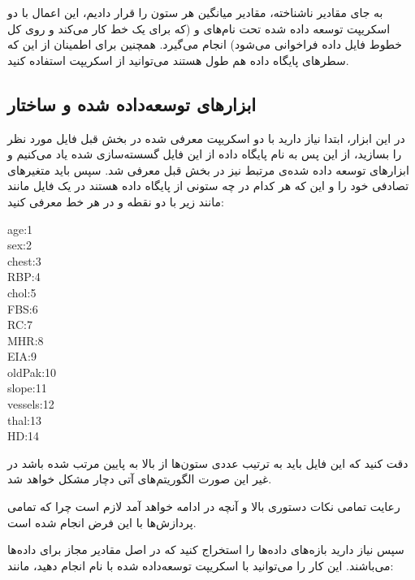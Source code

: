 \documentclass[11.5pt,a4paper]{article}
\begin{document}
به جای مقادیر ناشناخته، مقادیر میانگین هر ستون را قرار دادیم، این اعمال با دو اسکریپت توسعه داده شده تحت نام‌های  و  (که برای یک خط کار می‌کند و روی کل خطوط فایل داده فراخوانی می‌شود) انجام می‌گیرد. همچنین برای اطمینان از این که سطرهای پایگاه داده هم طول هستند می‌توانید از اسکریپت  استفاده کنید.


\subsection{ابزارهای توسعه‌داده شده و ساختار}

در این ابزار، ابتدا نیاز دارید با دو اسکریپت معرفی شده در بخش قبل فایل مورد نظر را بسازید، از این پس به نام پایگاه داده از این فایل گسسته‌سازی شده یاد می‌کنیم و ابزارهای توسعه‌ داده‌ شده‌ی مرتبط نیز در بخش قبل معرفی شد. سپس باید متغیرهای تصادفی خود را و این که هر کدام در چه ستونی از پایگاه داده هستند در یک فایل مانند  مانند زیر با دو نقطه و در هر خط معرفی کنید:

\begin{latin}
\noindent
age:1\\
sex:2\\
chest:3\\
RBP:4\\
chol:5\\
FBS:6\\
RC:7\\
MHR:8\\
EIA:9\\
oldPak:10\\
slope:11\\
vessels:12\\
thal:13\\
HD:14\\
\end{latin}

دقت کنید که این فایل باید به ترتیب عددی ستون‌ها از بالا به پایین مرتب شده باشد در غیر این صورت الگوریتم‌های آتی دچار مشکل خواهد شد. 


رعایت تمامی نکات دستوری بالا و آنچه در ادامه خواهد آمد لازم است چرا که تمامی پردازش‌ها با این فرض انجام شده است.

سپس نیاز دارید بازه‌های داده‌ها را استخراج کنید که در اصل مقادیر مجاز برای داده‌ها می‌باشند. این کار را می‌توانید با اسکریپت توسعه‌داده شده با نام  انجام دهید، مانند: 

\end{document}
